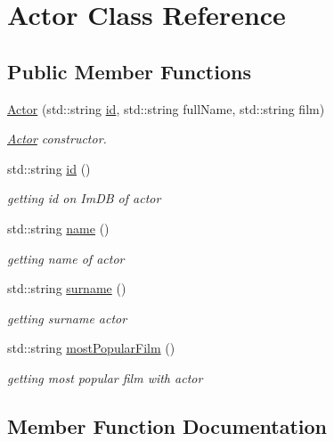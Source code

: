 \hypertarget{classActor}{}\section{Actor Class Reference}
\label{classActor}
\subsection*{Public Member Functions}
\begin{DoxyCompactItemize}
\item 
\mbox{\label{classActor_a3e39141bcd920c816e08bdfafe3f73d5}} 
\hyperlink{classActor_a3e39141bcd920c816e08bdfafe3f73d5}{Actor} (std\+::string \hyperlink{classActor_aeefa8310b4b62d376c69b3ef080f13d4}{id}, std\+::string full\+Name, std\+::string film)
\begin{DoxyCompactList}\small\item\em \hyperlink{classActor}{Actor} constructor. \end{DoxyCompactList}\item 
std\+::string \hyperlink{classActor_aeefa8310b4b62d376c69b3ef080f13d4}{id} ()
\begin{DoxyCompactList}\small\item\em getting id on Im\+DB of actor \end{DoxyCompactList}\item 
std\+::string \hyperlink{classActor_a9c6aa7e7cd5e8183ea66aa97eb6b015c}{name} ()
\begin{DoxyCompactList}\small\item\em getting name of actor \end{DoxyCompactList}\item 
std\+::string \hyperlink{classActor_a0cf1e28725cadacefb040914667cd5cc}{surname} ()
\begin{DoxyCompactList}\small\item\em getting surname actor \end{DoxyCompactList}\item 
std\+::string \hyperlink{classActor_a26e7eb5386554b5f35e91e55aca633c3}{most\+Popular\+Film} ()
\begin{DoxyCompactList}\small\item\em getting most popular film with actor \end{DoxyCompactList}\end{DoxyCompactItemize}


\subsection{Member Function Documentation}
\mbox{\label{classActor_aeefa8310b4b62d376c69b3ef080f13d4}} 
